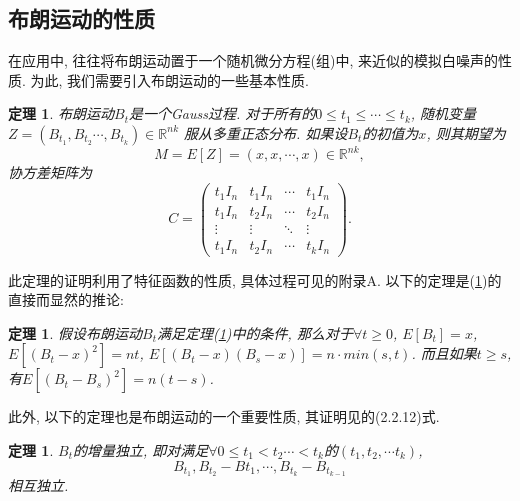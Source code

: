 \documentclass[notitlepage,cs4size,punct,oneside]{ctexrep}
\numberwithin{equation}{section}
\theoremstyle{mystyle}
\newtheorem{theorem}[definition]{\hspace{2em}定理}
\begin{document}
\subsection{布朗运动的性质}
在应用中, 往往将布朗运动置于一个随机微分方程(组)中, 来近似的模拟白噪声的性质\cite{hida1980brownian}. 
为此, 我们需要引入布朗运动的一些基本性质.\cite{oksendal2003stochastic}\cite{nelson1967dynamical}
\begin{theorem} \label{brownian1}
布朗运动$B_t$是一个Gauss过程. 对于所有的$0 \leqslant t_1 \leqslant\cdots\leqslant t_k$, 随机变量$Z = (B_{t_1}, B_{t_2}\cdots ,B_{t_k})\in \mathbb{R}^{nk}$ 服从多重正态分布. 如果设$B_t$的初值为$x$, 则其期望为 
$$M = E[Z] = (x, x, \cdots, x) \in \mathbb{R}^{nk},$$
协方差矩阵为
$$C = \left(\begin{matrix}
			t_1I_n & t_1I_n & \cdots & t_1I_n \\
			t_1I_n & t_2I_n & \cdots & t_2I_n \\
			\vdots & \vdots & \ddots & \vdots \\
			t_1I_n & t_2I_n & \cdots & t_kI_n 
			\end{matrix}
			\right).$$
\end{theorem}
此定理的证明利用了特征函数的性质, 具体过程可见\cite{oksendal2003stochastic}的附录A. 以下的定理是(\ref{brownian1})的直接而显然的推论:
\begin{theorem}
假设布朗运动$B_t$满足定理(\ref{brownian1})中的条件, 那么对于$\forall t\geqslant 0$, $E[B_t] = x$, $E\left[(B_t - x)^2\right] = nt$, $E[(B_t - x)(B_s - x)] = n\cdot min(s, t)$. 而且如果$t \geqslant s$, 有$E\left[(B_t - B_s)^2\right] = n(t-s)$.
\end{theorem}
此外, 以下的定理也是布朗运动的一个重要性质, 其证明见\cite{oksendal2003stochastic}的(2.2.12)式.
\begin{theorem}
$B_t$的增量独立, 即对满足$\forall 0 \leqslant t_1 < t_2 \cdots < t_k$的$(t_1, t_2, \cdots t_k)$,
$$B_{t_1}, B_{t_2}-B{t_1}, \cdots, B_{t_k}-B_{t_{k-1}}$$相互独立.
\end{theorem}
\end{document}
